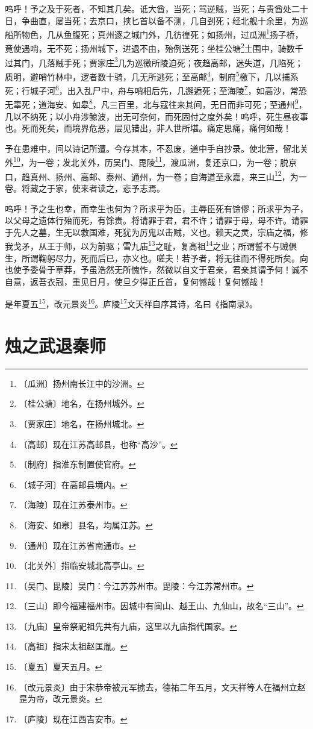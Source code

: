 \documentclass[12pt,UTF-8,openany]{ctexbook}
\begin{document}
\begin{normalsize}
    呜呼！予之及于死者，不知其几矣。诋大酋，当死；骂逆贼，当死；与贵酋处二十日，争曲直，屡当死；去京口，挟匕首以备不测，几自刭死；经北舰十余里，为巡船所物色，几从鱼腹死；真州逐之城门外，几彷徨死；如扬州，过瓜洲\footnote{〔瓜洲〕扬州南长江中的沙洲。}扬子桥，竟使遇哨，无不死；扬州城下，进退不由，殆例送死；坐桂公塘\footnote{〔桂公塘〕地名，在扬州城外。}土围中，骑数千过其门，几落贼手死；贾家庄\footnote{〔贾家庄〕地名，在扬州城北。}几为巡徼所陵迫死；夜趋高邮，迷失道，几陷死；质明，避哨竹林中，逻者数十骑，几无所逃死；至高邮\footnote{〔高邮〕现在江苏高邮县，也称“高沙”。}，制府\footnote{〔制府〕指淮东制置使官府。}檄下，几以捕系死；行城子河\footnote{〔城子河〕在高邮县境内。}，出入乱尸中，舟与哨相后先，几邂逅死；至海陵\footnote{〔海陵〕现在江苏泰州市。}，如高沙，常恐无辜死；道海安、如皋\footnote{〔海安、如皋〕县名，均属江苏。}，凡三百里，北与寇往来其间，无日而非可死；至通州\footnote{〔通州〕现在江苏省南通市。}，几以不纳死；以小舟涉鲸波，出无可奈何，而死固付之度外矣！呜呼，死生昼夜事也。死而死矣，而境界危恶，层见错出，非人世所堪。痛定思痛，痛何如哉！
    
    予在患难中，间以诗记所遭。今存其本，不忍废，道中手自抄录。使北营，留北关外\footnote{〔北关外〕指临安城北高亭山。}，为一卷；发北关外，历吴门、毘陵\footnote{〔吴门、毘陵〕吴门：今江苏苏州市。毘陵：今江苏常州市。}，渡瓜洲，复还京口，为一卷；脱京口，趋真州、扬州、高邮、泰州、通州，为一卷；自海道至永嘉，来三山\footnote{〔三山〕即今福建福州市。因城中有闽山、越王山、九仙山，故名“三山”。}，为一卷。将藏之于家，使来者读之，悲予志焉。
    
    呜呼！予之生也幸，而幸生也何为？所求乎为臣，主辱臣死有馀僇；所求乎为子，以父母之遗体行殆而死，有馀责。将请罪于君，君不许；请罪于母，母不许。请罪于先人之墓，生无以救国难，死犹为厉鬼以击贼，义也。赖天之灵，宗庙之福，修我戈矛，从王于师，以为前驱；雪九庙\footnote{〔九庙〕皇帝祭祀祖先共有九庙，这里以九庙指代国家。}之耻，复高祖\footnote{〔高祖〕指宋太祖赵匡胤。}之业；所谓誓不与贼俱生，所谓鞠躬尽力，死而后已，亦义也。嗟夫！若予者，将无往而不得死所矣。向也使予委骨于草莽，予虽浩然无所愧怍，然微以自文于君亲，君亲其谓予何！诚不自意，返吾衣冠，重见日月，使旦夕得正丘首，复何憾哉！复何憾哉！
    
    是年夏五\footnote{〔夏五〕夏天五月。}，改元景炎\footnote{〔改元景炎〕由于宋恭帝被元军掳去，德祐二年五月，文天祥等人在福州立赵昰为帝，改元景炎。}。庐陵\footnote{〔庐陵〕现在江西吉安市。}文天祥自序其诗，名曰《指南录》。
\end{normalsize}



\chapter{烛之武退秦师}
\end{document}
